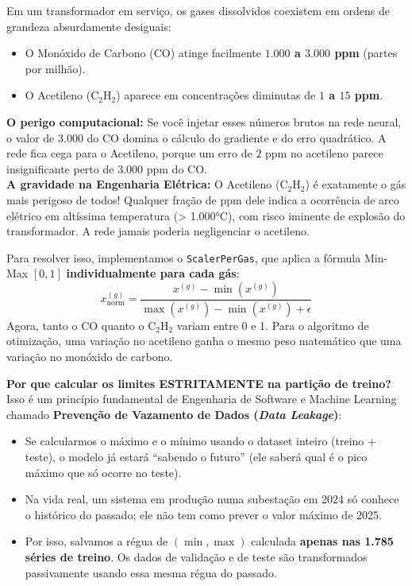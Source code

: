 \documentclass[10pt,a4paper]{article}
\begin{document}
\begin{conceitobox}
Em um transformador em serviço, os gases dissolvidos coexistem em ordens de grandeza absurdamente desiguais:
\begin{itemize}[leftmargin=*,itemsep=1pt]
  \item O Monóxido de Carbono ($\text{CO}$) atinge facilmente \textbf{$1.000$ a $3.000$ ppm} (partes por milhão).
  \item O Acetileno ($\text{C}_2\text{H}_2$) aparece em concentrações diminutas de \textbf{$1$ a $15$ ppm}.
\end{itemize}
\textbf{O perigo computacional:} Se você injetar esses números brutos na rede neural, o valor de $3.000$ do $\text{CO}$ domina o cálculo do gradiente e do erro quadrático. A rede fica cega para o Acetileno, porque um erro de $2$ ppm no acetileno parece insignificante perto de $3.000$ ppm do CO.\\
\textbf{A gravidade na Engenharia Elétrica:} O Acetileno ($\text{C}_2\text{H}_2$) é exatamente o gás mais perigoso de todos! Qualquer fração de ppm dele indica a ocorrência de arco elétrico em altíssima temperatura (> 1.000°C), com risco iminente de explosão do transformador. A rede jamais poderia negligenciar o acetileno.
\end{conceitobox}

\begin{decisaobox}
Para resolver isso, implementamos o \texttt{ScalerPerGas}, que aplica a fórmula Min-Max $[0, 1]$ \textbf{individualmente para cada gás}:
$$x_{\text{norm}}^{(g)} = \frac{x^{(g)} - \min(x^{(g)})}{\max(x^{(g)}) - \min(x^{(g)}) + \epsilon}$$
Agora, tanto o $\text{CO}$ quanto o $\text{C}_2\text{H}_2$ variam entre 0 e 1. Para o algoritmo de otimização, uma variação no acetileno ganha o mesmo peso matemático que uma variação no monóxido de carbono.

\textbf{Por que calcular os limites ESTRITAMENTE na partição de treino?}
Isso é um princípio fundamental de Engenharia de Software e Machine Learning chamado \textbf{Prevenção de Vazamento de Dados (\textit{Data Leakage})}:
\begin{itemize}[leftmargin=*,itemsep=1pt]
  \item Se calcularmos o máximo e o mínimo usando o dataset inteiro (treino + teste), o modelo já estará ``sabendo o futuro'' (ele saberá qual é o pico máximo que só ocorre no teste).
  \item Na vida real, um sistema em produção numa subestação em 2024 só conhece o histórico do passado; ele não tem como prever o valor máximo de 2025.
  \item Por isso, salvamos a régua de $(\min, \max)$ calculada \textbf{apenas nas 1.785 séries de treino}. Os dados de validação e de teste são transformados passivamente usando essa mesma régua do passado.
\end{itemize}
\end{decisaobox}
\end{document}
